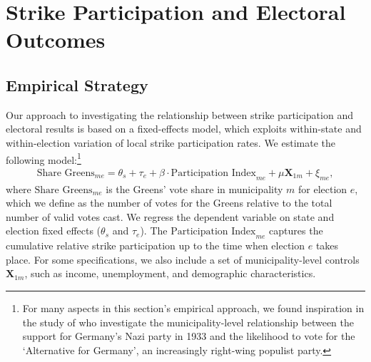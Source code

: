\bigskip
\section{Strike Participation and Electoral Outcomes}\label{sec_greta_cons:strike_participation_elections}



\subsection{Empirical Strategy}


Our approach to investigating the relationship between strike participation and electoral results is based on a fixed-effects model, which exploits within-state and within-election variation of local strike participation rates. We estimate the following model:\footnote{For many aspects in this section's empirical approach, we found inspiration in the study of \cite{cantoni2020persistence} who investigate the municipality-level relationship between the support for Germany's Nazi party in 1933 and the likelihood to vote for the `Alternative for Germany', an increasingly right-wing populist party.}
\begin{align}
	\text{Share Greens}_{me} = \theta_s + \tau_e + \beta\cdot\text{Participation Index}_{me} + \mu \mathbf{X}_{1m} + \xi_{me},\label{eq_greta_cons:vote_share_greens}
\end{align}
where $\text{Share Greens}_{me}$ is the Greens' vote share in municipality $m$ for election $e$, which we define as the number of votes for the Greens relative to the total number of valid votes cast. We regress the dependent variable on state and election fixed effects ($\theta_s$ and $\tau_e$). The $\text{Participation Index}_{me}$ captures the cumulative relative strike participation up to the time when election $e$ takes place. For some specifications, we also include a set of municipality-level controls $\mathbf{X}_{1m}$, such as income, unemployment, and demographic characteristics. 


